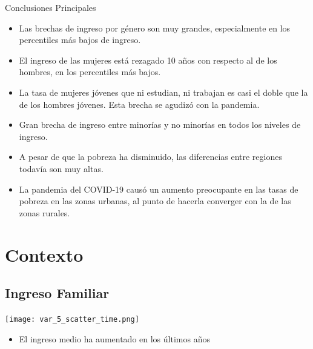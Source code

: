 \documentclass[aspectratio=169]{beamer}
\begin{document}
    
    
    \begin{frame}{Conclusiones Principales}
    
    \begin{itemize}
        \item Las brechas de ingreso por género son muy grandes, especialmente en los percentiles más bajos de ingreso.
        \item El ingreso de las mujeres está rezagado 10 años con respecto al de los hombres, en los percentiles más bajos.
        \item La tasa de mujeres jóvenes que ni estudian, ni trabajan es casi el doble que la de los hombres jóvenes. Esta brecha se agudizó con la pandemia.
    \item Gran brecha de ingreso entre minorías y no minorías  en todos los niveles de ingreso.
    \item A pesar de que la pobreza ha disminuido, las diferencias entre regiones todavía son muy altas.
    \item La pandemia del COVID-19 causó un aumento preocupante en las tasas de pobreza en las zonas urbanas, al punto de hacerla converger con la de las zonas  rurales.
    \end{itemize}

    
    \end{frame}
    
    \section{Contexto}
        
    \subsection{Ingreso Familiar}
    
    \begin{slide}{3} 
                      \begin{imagecolumn}
                       
                    \texttt{[image: var\_5\_scatter\_time.png]} 
            \end{imagecolumn}
            \begin{textcolumn}
                \begin{itemize}
                    \item El ingreso medio ha aumentado en los últimos años
                \end{itemize}
            \end{textcolumn}

    \printcolumns
    \end{slide}
    
    
\end{document}
